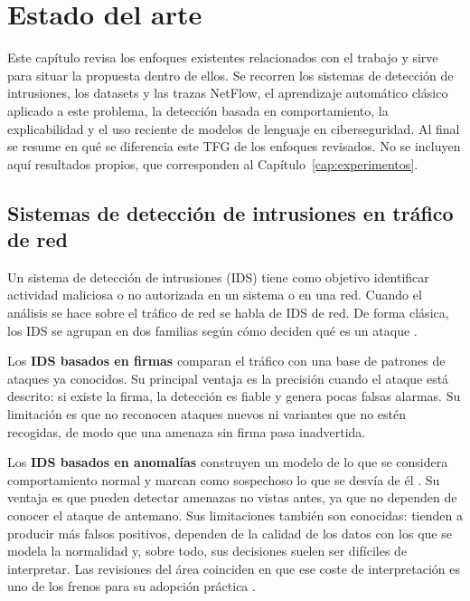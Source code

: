 \chapter{Estado del arte}
\label{cap:estado_arte}

Este capítulo revisa los enfoques existentes relacionados con el trabajo y sirve para situar la propuesta dentro de ellos. Se recorren los sistemas de detección de intrusiones, los datasets y las trazas NetFlow, el aprendizaje automático clásico aplicado a este problema, la detección basada en comportamiento, la explicabilidad y el uso reciente de modelos de lenguaje en ciberseguridad. Al final se resume en qué se diferencia este TFG de los enfoques revisados. No se incluyen aquí resultados propios, que corresponden al Capítulo~\ref{cap:experimentos}.

\section{Sistemas de detección de intrusiones en tráfico de red}
\label{sec:arte_ids}

Un sistema de detección de intrusiones (IDS) tiene como objetivo identificar actividad maliciosa o no autorizada en un sistema o en una red. Cuando el análisis se hace sobre el tráfico de red se habla de IDS de red. De forma clásica, los IDS se agrupan en dos familias según cómo deciden qué es un ataque \cite{garciateodoro2009anomaly}.

Los \textbf{IDS basados en firmas} comparan el tráfico con una base de patrones de ataques ya conocidos. Su principal ventaja es la precisión cuando el ataque está descrito: si existe la firma, la detección es fiable y genera pocas falsas alarmas. Su limitación es que no reconocen ataques nuevos ni variantes que no estén recogidas, de modo que una amenaza sin firma pasa inadvertida.

Los \textbf{IDS basados en anomalías} construyen un modelo de lo que se considera comportamiento normal y marcan como sospechoso lo que se desvía de él \cite{chandola2009anomaly}. Su ventaja es que pueden detectar amenazas no vistas antes, ya que no dependen de conocer el ataque de antemano. Sus limitaciones también son conocidas: tienden a producir más falsos positivos, dependen de la calidad de los datos con los que se modela la normalidad y, sobre todo, sus decisiones suelen ser difíciles de interpretar. Las revisiones del área coinciden en que ese coste de interpretación es uno de los frenos para su adopción práctica \cite{buczak2016survey}.


